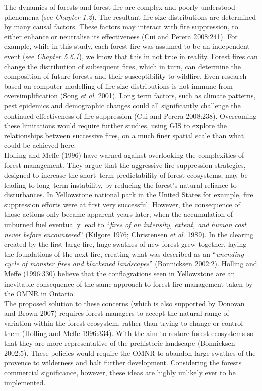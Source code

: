 \begin{spacing}{1.5}
\noindent The dynamics of forests and forest fire are complex and poorly understood phenomena (see \emph{Chapter 1.2}). The resultant fire size distributions are determined by many causal factors. These factors may interact with fire suppression, to either enhance or neutralise its effectiveness (Cui and Perera 2008:241). For example, while in this study, each forest fire was assumed to be an independent event (see \emph{Chapter 5.6.1}), we know that this in not true in reality. Forest fires can change the distribution of subsequent fires, which in turn, can determine the composition of future forests and their susceptibility to wildfire. Even research based on computer modelling of fire size distributions is not immune from oversimplification (Song \emph{et al}. 2001). Long term factors, such as climate patterns, pest epidemics and demographic changes could all significantly challenge the continued effectiveness of fire suppression (Cui and Perera 2008:238). Overcoming these limitations would require further studies, using GIS to explore the relationships between successive fires, on a much finer spatial scale than what could be achieved here. \\

\noindent Holling and Meffe (1996) have warned against overlooking the complexities of forest management. They argue that the aggressive fire suppression strategies, designed to increase the short--term predictability of forest ecosystems, may be leading to long--term instability, by reducing the forest's natural reliance to disturbances. In Yellowstone national park in the United States for example, fire suppression efforts were at first very successful. However, the consequence of those actions only became apparent years later, when the accumulation of unburned fuel eventually lead to ``\emph{fires of an intensity, extent, and human cost never before encountered}'' (Kilgore 1976; Christensen \emph{et al}. 1989). In the clearing created by the first large fire, huge swathes of new forest grew together, laying the foundations of the next fire, creating what was described as an ``\emph{unending cycle of monster fires and blackened landscapes}'' (Bonnicksen 2002:2). Holling and Meffe (1996:330) believe that the conflagrations seen in Yellowstone are an inevitable consequence of the same approach to forest fire management taken by the OMNR in Ontario. \\

\noindent The proposed solution to these concerns (which is also supported by Donovan and Brown 2007) requires forest managers to accept the natural range of variation within the forest ecosystem, rather than trying to change or control them (Holling and Meffe 1996:334). With the aim to restore forest ecosystems so that they are more representative of the prehistoric landscape (Bonnicksen 2002:5). These policies would require the OMNR to abandon large swathes of the provence to wilderness and halt further development. Considering the forests commercial significance, however, these ideas are highly unlikely ever to be implemented.


\end{spacing}

